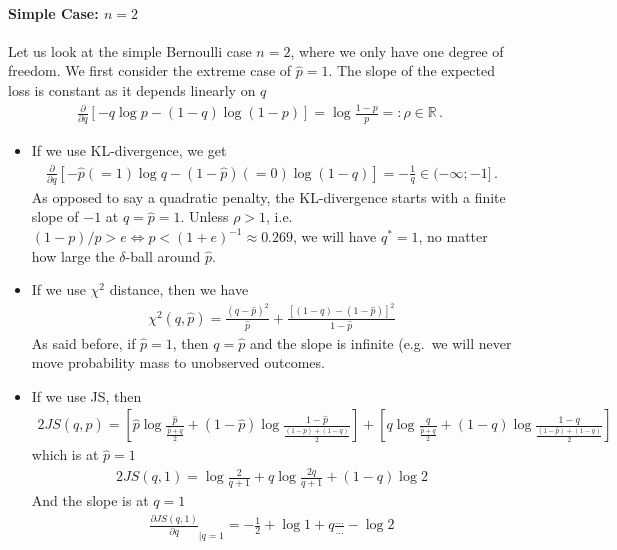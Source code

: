 \documentclass{article}
\renewcommand{\Re}{{\mathbb R}}
\begin{document}
\paragraph{Simple Case: $n=2$} Let us look at the simple Bernoulli case $n=2$, where we only have one degree of freedom. We first consider the extreme case of $\hat p=1$. The slope of the expected loss is constant as it depends linearly on $q$
\begin{align}
\frac{\partial}{\partial q} \left[ - q \log p - (1-q) \log (1-p) \right] = \log \frac{1-p}{p} =: \rho  \in \Re\,.
\end{align}
\begin{itemize}
\item If we use KL-divergence, we get
\begin{align}
\frac {\partial}{\partial q} \left[ -\hat p (=1) \log q - (1-\hat p) (=0) \log (1-q) \right] = - \frac 1q \in (-\infty;-1] \,.
\end{align}
As opposed to say a quadratic penalty, the KL-divergence starts with a finite slope of $-1$ at $q = \hat p=1$. Unless $\rho > 1$, i.e.~$(1-p)/p >e \iff p < (1+e)^{-1} \approx 0.269$, we will have $q^*= 1$, no matter how large the $\delta$-ball around $\hat p$. 
\item If we use $\chi^2 $ distance, then we have 
\begin{align}
\chi^2(q, \hat p) = \frac{(q-\hat p)^2}{\hat p} + \frac{[(1-q) - (1-\hat p)]^2}{1-\hat p}
\end{align} 
As said before, if $\hat p=1$, then $q=\hat p$ and the slope is infinite (e.g.~we will never move probability mass to unobserved outcomes. 
\item If we use JS,  then
\begin{align}
2JS(q,\hat p) = \left[ \hat p \log \frac{\hat p}{\frac{\hat p +q}2} + (1-\hat p) \log \frac{1-\hat p}{\frac{(1-\hat p) + (1- q)}{2}}\right]
+\left[ q \log \frac{q}{\frac{\hat p +q}2} + (1-q) \log \frac{1-q}{\frac{(1-\hat p) + (1- q)}{2}} \right]
\end{align}
which is at $\hat p=1$ 
\begin{align}
2JS(q,1) = \log \frac{2}{q+1} + q \log \frac {2q}{q+1} + (1-q) \log 2
\end{align}
And the slope is at $q=1$
\begin{align}
\frac{\partial JS(q,1)}{\partial q}_{\Big|q=1} = -\frac{1}{2} + \log  1 +q \frac{...}{...} - \log 2
\end{align}
\end{itemize}
\end{document}
